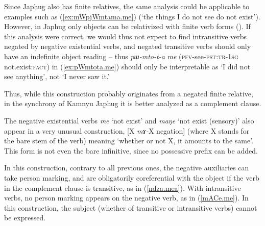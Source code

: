 \documentclass[oneside,a4paper,11pt]{article}
\newcommand{\ipa}[1]{\textit{\phon#1}}
\newcommand{\jpg}[2]{\ipa{#1} `#2'}
\newcommand{\refb}[1]{(\ref{#1})}
\begin{document}
Since Japhug also has finite relatives, the same analysis could be applicable to examples such as \refb{ex:mWpjWmtama.me} (`the things I do not see do not exist').  However, in Japhug only objects can be relativized with finite verb forms (\citealt[12-3]{jacques16relatives}). If this analysis were correct, we would thus not expect to find intransitive verbs negated  by negative existential verbs, and negated transitive verbs should only have an indefinite object reading -- thus \ipa{pɯ-mto-t-a}  \ipa{me} (\textsc{pfv}-see-\textsc{pst:tr-1sg} not.exist:\textsc{fact})
in \refb{ex:pWmtota.me} should only be interpretable as `I did not see anything', not `I never saw it.'

Thus, while this construction probably originates from a negated finite relative, in the synchrony of Kamnyu Japhug it is better analyzed as a complement clause.


The negative existential verbs  \jpg{me}{not exist} and \jpg{maŋe}{not exist (sensory)} also appear in a very unusual construction, [X \ipa{mɤ-}X negation] (where X stands for the bare stem of the verb) meaning `whether or not X, it amounts to the same'. This form is not even the bare infinitive, since no possessive prefix can be added.

In this construction, contrary to all previous ones, the negative auxiliaries can take person marking, and are obligatorily coreferential with the object if the verb in the complement clause is transitive, as in \refb{ndza.mea}. With intransitive verbs, no person marking appears on the negative verb, as in \refb{mACe.me}. In this construction, the subject (whether of transitive or intransitive verbs) cannot be expressed.
\end{document}
